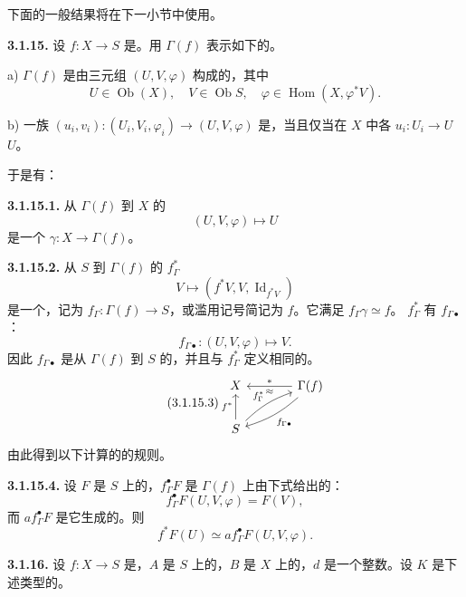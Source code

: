 下面的一般结果将在下一小节中使用。

\textbf{3.1.15.} 设 $f\colon X\to S$ 是。用 $\Gamma(f)$ 表示如下的。

a)  $\Gamma(f)$ 是由三元组 $(U,V,\varphi)$ 构成的，其中
\[
 U\in\operatorname{Ob}(X),\quad V\in\operatorname{Ob}S,\quad
 \varphi\in\operatorname{Hom}(X,\varphi^*V).
\]

b) 一族 $(u_i,v_i)\colon(U_i,V_i,\varphi_i)\to(U,V,\varphi)$ 是，当且仅当在 $X$ 中各 $u_i\colon U_i\to U$  $U$。

于是有：

\textbf{3.1.15.1.} 从 $\Gamma(f)$ 到 $X$ 的
\[
 (U,V,\varphi)\longmapsto U
\]
是一个 $\gamma\colon X\to\Gamma(f)$。

\textbf{3.1.15.2.} 从 $S$ 到 $\Gamma(f)$ 的 $f_\Gamma^*$
\[
 V\longmapsto(f^*V,V,\operatorname{Id}_{f^*V})
\]
是一个，记为 $f_\Gamma\colon\Gamma(f)\to S$，或滥用记号简记为 $f$。它满足 $f_\Gamma\gamma\simeq f$。 $f_\Gamma^*$ 有 $f_{\Gamma\bullet}$：
\[
 f_{\Gamma\bullet}\colon(U,V,\varphi)\longmapsto V.
\]
因此 $f_{\Gamma\bullet}$ 是从 $\Gamma(f)$ 到 $S$ 的，并且与 $f_\Gamma^*$ 定义相同的。
\begin{equation}\tag{3.1.15.3}
\begin{tikzcd}[column sep=large]
X&\Gamma(f)\arrow[l,"*"',"\approx"]\arrow[dl,bend left=12,"f_{\Gamma\bullet}"]\\
S\arrow[u,"f^*"]\arrow[ur,bend left=12,"f_\Gamma^*"]&
\end{tikzcd}
\end{equation}
由此得到以下计算的的规则。

\textbf{3.1.15.4.} 设 $F$ 是 $S$ 上的，$f_\Gamma^\bullet F$ 是 $\Gamma(f)$ 上由下式给出的：
\[
 f_\Gamma^\bullet F(U,V,\varphi)=F(V),
\]
而 $af_\Gamma^\bullet F$ 是它生成的。则
\[
 f^*F(U)\simeq af_\Gamma^\bullet F(U,V,\varphi).
\]

\textbf{3.1.16.} 设 $f\colon X\to S$ 是，$A$ 是 $S$ 上的，$B$ 是 $X$ 上的，$d$ 是一个整数。设 $K$ 是下述类型的。

